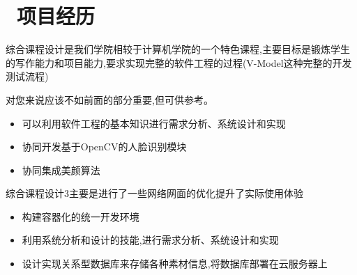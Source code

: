 \documentclass{resume}
\begin{document}
\section{\faUsers\ 项目经历}
综合课程设计是我们学院相较于计算机学院的一个特色课程,主要目标是锻炼学生的写作能力和项目能力,要求实现完整的软件工程的过程(V-Model这种完整的开发测试流程)

对您来说应该不如前面的部分重要,但可供参考。
\begin{onehalfspacing}
\begin{itemize}
  \item 可以利用软件工程的基本知识进行需求分析、系统设计和实现
  \item 协同开发基于OpenCV的人脸识别模块
  \item 协同集成美颜算法
\end{itemize}
\end{onehalfspacing}

\begin{onehalfspacing}
综合课程设计3主要是进行了一些网络网面的优化提升了实际使用体验
\begin{itemize}
  \item 构建容器化的统一开发环境
  \item 利用系统分析和设计的技能,进行需求分析、系统设计和实现
  \item 设计实现关系型数据库来存储各种素材信息,将数据库部署在云服务器上
\end{itemize}
\end{onehalfspacing}

\newpage


\end{document}
